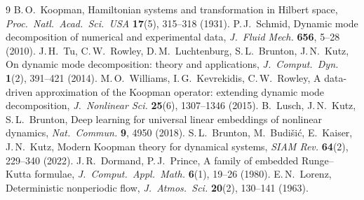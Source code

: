 \documentclass[11pt,a4paper]{article}
\begin{document}
\begin{thebibliography}{9}
 B.\,O.~Koopman, Hamiltonian systems and transformation in Hilbert space,
  \emph{Proc.\ Natl.\ Acad.\ Sci.\ USA} \textbf{17}(5), 315--318 (1931).
 P.\,J.~Schmid, Dynamic mode decomposition of numerical and experimental data,
  \emph{J.\ Fluid Mech.} \textbf{656}, 5--28 (2010).
 J.\,H.~Tu, C.\,W.~Rowley, D.\,M.~Luchtenburg, S.\,L.~Brunton, J.\,N.~Kutz, On dynamic mode decomposition:
  theory and applications, \emph{J.\ Comput.\ Dyn.} \textbf{1}(2), 391--421 (2014).
 M.\,O.~Williams, I.\,G.~Kevrekidis, C.\,W.~Rowley, A data-driven approximation of the Koopman operator:
  extending dynamic mode decomposition, \emph{J.\ Nonlinear Sci.} \textbf{25}(6), 1307--1346 (2015).
 B.~Lusch, J.\,N.~Kutz, S.\,L.~Brunton, Deep learning for universal linear embeddings of nonlinear dynamics,
  \emph{Nat.\ Commun.} \textbf{9}, 4950 (2018).
 S.\,L.~Brunton, M.~Budi\v{s}i\'c, E.~Kaiser, J.\,N.~Kutz, Modern Koopman theory for dynamical systems,
  \emph{SIAM Rev.} \textbf{64}(2), 229--340 (2022).
 J.\,R.~Dormand, P.\,J.~Prince, A family of embedded Runge--Kutta formulae,
  \emph{J.\ Comput.\ Appl.\ Math.} \textbf{6}(1), 19--26 (1980).
 E.\,N.~Lorenz, Deterministic nonperiodic flow, \emph{J.\ Atmos.\ Sci.} \textbf{20}(2), 130--141 (1963).
\end{thebibliography}
\end{document}
